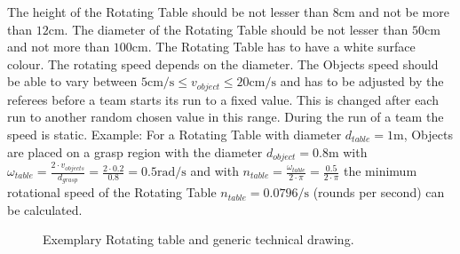 The height of the Rotating Table should be not lesser than $8\si{\centi\meter}$ and not be more than $12\si{\centi\meter}$. The diameter of the Rotating Table should be not lesser than $50\si{\centi\meter}$ and not more than $100\si{\centi\meter}$. The Rotating Table has to have a white surface colour. The rotating speed depends on the diameter. The Objects speed should be able to vary between $5 \si{\centi\meter\per\second} \le v_{object} \le 20 \si{\centi\meter\per\second}$ and has to be adjusted by the referees before a team starts its run to a fixed value. This is changed after each run to another random chosen value in this range. During the run of a team the speed is static. Example: For a Rotating Table with diameter $d_{table}=1\si{\meter}$, Objects are placed on a grasp region with the diameter $d_{object}=0.8\si{\meter}$ with $\omega_{table} = \frac{2 \cdot v_{objects} }{d_{grasp}}=\frac{2 \cdot 0.2}{0.8}=0.5\si{\radian\per\second}$ and with $n_{table}=\frac{\omega_{table}}{2 \cdot \pi}=\frac{0.5}{2 \cdot \pi}$ the minimum rotational speed of the Rotating Table $n_{table}= 0.0796 \si{\per\second}$ (rounds per second) can be calculated.  

\begin{figure}[h!]
	\centering
	\hspace{0.05\textwidth}
	\caption{Exemplary Rotating table and generic technical drawing.}%
	\label{fig:rottable}
\end{figure}


